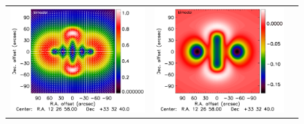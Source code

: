 \documentclass[traditabstract]{aa}
\begin{document}
\begin{figure}[h]
{\begin{tabular}{lll}
\includegraphics[trim=2.3cm 2.2cm 0cm 0cm, clip=true, scale=1]{Figure/Grad_bimodal_15_15_45.pdf} &
\includegraphics[trim=2.3cm 2.2cm 0cm 0cm, clip=true, scale=1]{Figure/DoG_bimodal_15_15_45.pdf} \\

\end{tabular}}
\end{figure}
\end{document}
